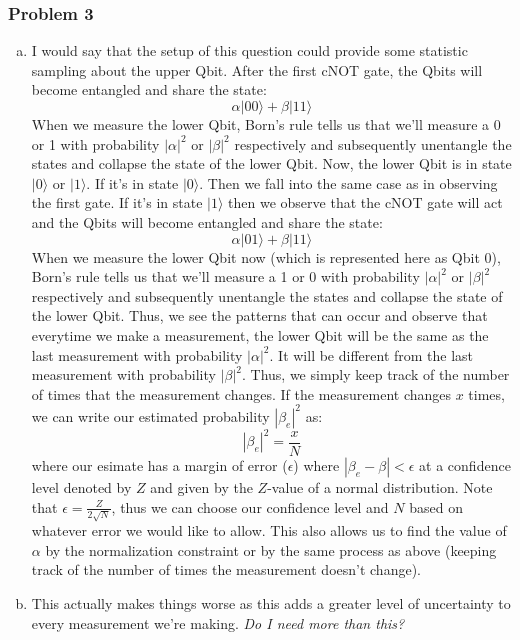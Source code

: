 \documentclass[a4paper,11pt]{article}
\begin{document}
\subsubsection*{Problem 3} 
\begin{enumerate}[a)]
    \item I would say that the setup of this question could provide some statistic sampling about the upper Qbit. After the first cNOT gate, the Qbits will become entangled and share the state:
        $$\alpha|00\rangle + \beta|11\rangle$$
        When we measure the lower Qbit, Born's rule tells us that we'll measure a 0 or 1 with probability $|\alpha|^2$ or $|\beta|^2$ respectively and subsequently unentangle the states and collapse the state of the lower Qbit. Now, the lower Qbit is in state $|0\rangle$ or $|1\rangle$. If it's in state $|0\rangle$. Then we fall into the same case as in observing the first gate. If it's in state $|1\rangle$ then we observe that the cNOT gate will act and the Qbits will become entangled and share the state:
        $$\alpha|01\rangle + \beta|11\rangle$$
        When we measure the lower Qbit now (which is represented here as Qbit 0), Born's rule tells us that we'll measure a 1 or 0 with probability $|\alpha|^2$ or $|\beta|^2$ respectively and subsequently unentangle the states and collapse the state of the lower Qbit. Thus, we see the patterns that can occur and observe that everytime we make a measurement, the lower Qbit will be the same as the last measurement with probability $|\alpha|^2$. It will be different from the last measurement with probability $|\beta|^2$. Thus, we simply keep track of the number of times that the measurement changes. If the measurement changes $x$ times, we can write our estimated probability $|\beta_e|^2$ as:
        $$|\beta_e|^2=\frac{x}{N}$$
        where our esimate has a margin of error ($\epsilon$) where $|\beta_e-\beta|<\epsilon$ at a confidence level denoted by $Z$ and given by the $Z$-value of a normal distribution. Note that $\epsilon=\frac{Z}{2\sqrt{N}}$, thus we can choose our confidence level and $N$ based on whatever error we would like to allow. This also allows us to find the value of $\alpha$ by the normalization constraint or by the same process as above (keeping track of the number of times the measurement doesn't change).
    \item This actually makes things worse as this adds a greater level of uncertainty to every measurement we're making.
\emph{\color{red} Do I need more than this?}
\end{enumerate}
\end{document}
